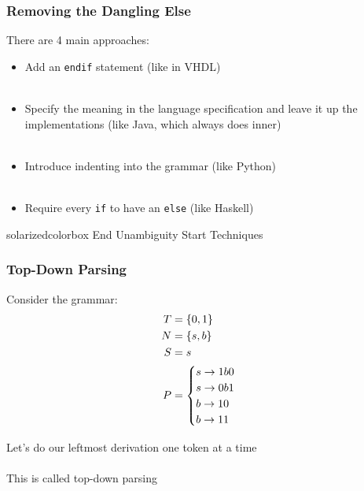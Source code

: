 \documentclass[aspectratio=169]{beamer}
\begin{document}
\begin{frame}
\frametitle{Removing the Dangling Else}

There are 4 main approaches:
\vspace{1em}
\begin{itemize}
  \item Add an \lstinline{endif} statement (like in VHDL)\\~\\
  \item Specify the meaning in the language specification and leave it up the
    implementations (like Java, which always does inner)\\~\\
  \item Introduce indenting into the grammar (like Python)\\~\\
  \item Require every \lstinline{if} to have an \lstinline{else} (like Haskell)
\end{itemize}
\end{frame}

\begin{frame}
  \begin{beamercolorbox}[wd=\paperwidth, sep=2em]{solarizedcolorbox}
    { End Unambiguity \hfill
      Start Techniques}
  \end{beamercolorbox}
\end{frame}

\begin{frame}
\frametitle{Top-Down Parsing}

Consider the grammar:
\begin{align*}
T &= \{ \text{\lstinline{0}}, \text{\lstinline{1}} \}\\
N &= \{ s, b \}\\
S &= s\\
P &= \begin{cases}s \rightarrow \text{\lstinline{1}} b \text{\lstinline{0}}\\
  s \rightarrow \text{\lstinline{0}} b \text{\lstinline{1}}\\
  b \rightarrow \text{\lstinline{1}} \text{\lstinline{0}}\\
  b \rightarrow \text{\lstinline{1}} \text{\lstinline{1}}\end{cases}
\end{align*}

Let's do our leftmost derivation one token at a time\\~\\

This is called \alert{top-down parsing}
\end{frame}
\end{document}

